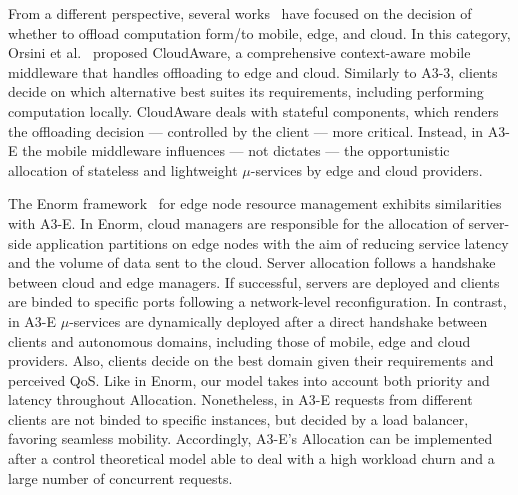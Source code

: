 From a different perspective, several works~\cite{ZhaoZGZN15, Liu:2016, OrsiniBL16, Xu:2018} have focused on the decision of whether to offload computation form/to mobile, edge, and cloud. 
In this category, Orsini et al.~\cite{OrsiniBL16} proposed CloudAware, a comprehensive context-aware mobile middleware that handles offloading to edge and cloud. Similarly to A3-3, clients decide on which alternative best suites its requirements, including performing computation locally. CloudAware deals with stateful components, which renders the offloading decision --- controlled by the client --- more critical. Instead, in A3-E the mobile middleware influences --- not dictates --- the opportunistic allocation of stateless and lightweight $\mu$-services by edge and cloud providers.


The Enorm framework~\cite{wang2017enorm} for edge node resource management exhibits similarities with A3-E. In Enorm, cloud managers are responsible for the allocation of server-side application partitions on edge nodes with the aim of reducing service latency and the volume of data sent to the cloud. Server allocation follows a handshake between cloud and edge managers. If successful, servers are deployed and clients are binded to specific ports following a network-level reconfiguration. In contrast, in A3-E $\mu$-services are dynamically deployed after a direct handshake between clients and autonomous domains, including those of mobile, edge and cloud providers. Also, clients decide on the best domain given their requirements and perceived QoS. Like in Enorm, our model takes into account both priority and latency throughout Allocation. Nonetheless, in A3-E requests from different clients are not binded to specific instances, but decided by a load balancer, favoring seamless mobility. Accordingly, A3-E's Allocation can be implemented after a control theoretical model able to deal with a high workload churn and a large number of concurrent requests. 

